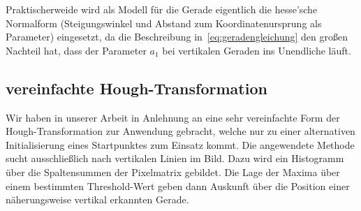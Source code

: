 Praktischerweide wird als Modell für die Gerade eigentlich die hesse'sche Normalform (Steigungswinkel und Abstand zum Koordinatenursprung als Parameter) eingesetzt, da die Beschreibung in~\ref{eq:geradengleichung} den großen Nachteil hat, dass der Parameter \( a_1 \) bei vertikalen Geraden ins Unendliche läuft. 

\subsection{vereinfachte Hough-Transformation}
Wir haben in unserer Arbeit in Anlehnung an \autocite{} eine sehr vereinfachte Form der Hough-Transformation zur Anwendung gebracht, welche nur zu einer alternativen Initialisierung eines Startpunktes zum Einsatz kommt. Die angewendete Methode sucht ausschließlich nach vertikalen Linien im Bild. Dazu wird ein Histogramm über die Spaltensummen der Pixelmatrix gebildet. Die Lage der Maxima über einem bestimmten Threshold-Wert geben dann Auskunft über die Position einer näherungsweise vertikal erkannten Gerade.